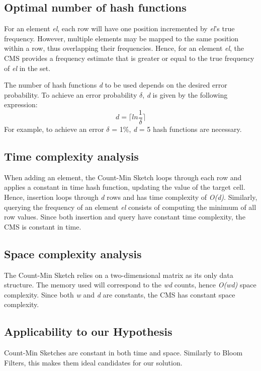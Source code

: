 \subsection*{Optimal number of hash functions} 
For an element \textit{el}, each row will have one position incremented by \textit{el}'s true frequency. However, multiple elements may be mapped to the same position within a row, thus overlapping their frequencies. Hence, for an element \textit{el}, the CMS provides a frequency estimate that is greater or equal to the true frequency of \textit{el} in the set.

The number of hash functions \textit{d} to be used depends on the desired error probability. To achieve an error probability $\delta$, \textit{d} is given by the following expression:
\begin{equation}
    d = \lceil ln \frac{1}{\delta} \rceil
\end{equation}
For example, to achieve an error $\delta$ = 1\%, \textit{d} = 5 hash functions are necessary.

\subsection*{Time complexity analysis}
When adding an element, the Count-Min Sketch loops through each row and applies a constant in time hash function, updating the value of the target cell. Hence, insertion loops through \textit{d} rows and has time complexity of \textit{O(d)}. Similarly, querying the frequency of an element \textit{el} consists of computing the minimum of all row values. Since both insertion and query have constant time complexity, the CMS is constant in time.

\subsection*{Space complexity analysis}
The Count-Min Sketch relies on a two-dimensional matrix as its only data structure. The memory used will correspond to the \textit{wd} counts, hence \textit{O(wd)} space complexity. Since both \textit{w} and \textit{d} are constants, the CMS has constant space complexity.

\subsection*{Applicability to our Hypothesis}
Count-Min Sketches are constant in both time and space. Similarly to Bloom Filters, this makes them ideal candidates for our solution. 

